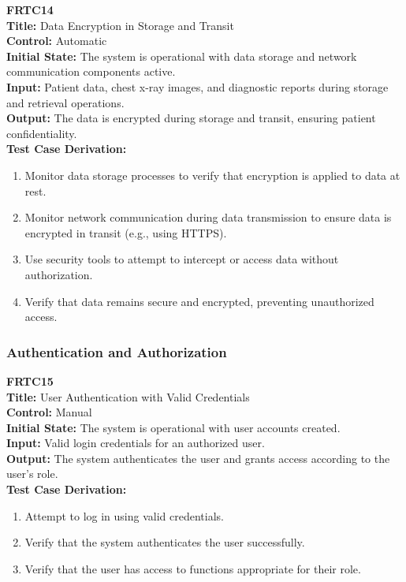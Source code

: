 \documentclass[12pt, titlepage]{article}
\begin{document}
\textbf{FRTC14}\\
\textbf{Title:} Data Encryption in Storage and Transit\\
\textbf{Control:} Automatic\\
\textbf{Initial State:} The system is operational with data storage and network communication components active.\\
\textbf{Input:} Patient data, chest x-ray images, and diagnostic reports during storage and retrieval operations.\\
\textbf{Output:} The data is encrypted during storage and transit, ensuring patient confidentiality.\\
\textbf{Test Case Derivation:}
\begin{enumerate}
  \item Monitor data storage processes to verify that encryption is applied to data at rest.
  \item Monitor network communication during data transmission to ensure data is encrypted in transit (e.g., using HTTPS).
  \item Use security tools to attempt to intercept or access data without authorization.
  \item Verify that data remains secure and encrypted, preventing unauthorized access.
\end{enumerate}
\vspace{1em}

\subsubsection{Authentication and Authorization}
\textbf{FRTC15}\\
\textbf{Title:} User Authentication with Valid Credentials\\
\textbf{Control:} Manual\\
\textbf{Initial State:} The system is operational with user accounts created.\\
\textbf{Input:} Valid login credentials for an authorized user.\\
\textbf{Output:} The system authenticates the user and grants access according to the user's role.\\
\textbf{Test Case Derivation:}
\begin{enumerate}
  \item Attempt to log in using valid credentials.
  \item Verify that the system authenticates the user successfully.
  \item Verify that the user has access to functions appropriate for their role.
\end{enumerate}
\vspace{1em}
\end{document}
